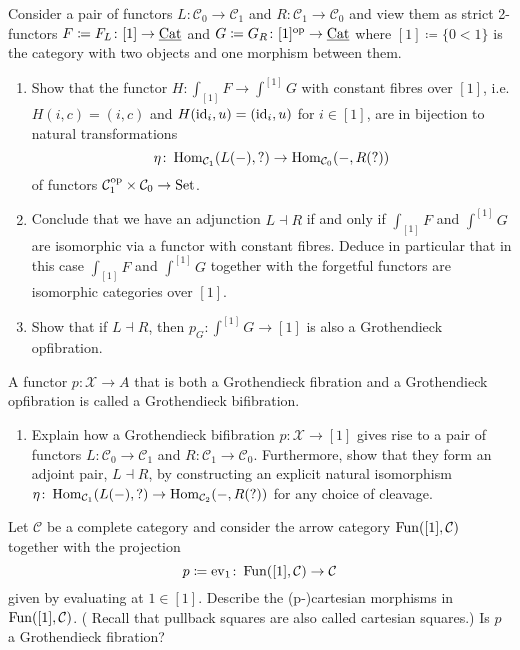 \begin{Exercise}
	Consider a pair of functors $ L \colon \mathcal{ C }_0 \to \mathcal{ C }_1 $ and $ R  \colon \mathcal{ C }_1 \to \mathcal{ C }_0 $ and view them as strict 2-functors $ F \coloneqq F_L \colon [ 1 ] \to \underline{ \operatorname{Cat} } $ and $ G \coloneqq G_R \colon [ 1 ]^{ \operatorname{op} } \to \underline{ \operatorname{Cat} } $ where $ [ 1 ] \coloneqq \{ 0 < 1 \} $ is the category with two objects and one morphism between them.
	
	\begin{enumerate}[label=(\alph*)]
		\item 
		Show that the functor $ H \colon \int_{ [ 1 ] } F \to \int^{ [ 1 ] } G $ with constant fibres over $ [ 1 ] $, i.e. $ H ( i , c ) = ( i , c ) $ and $ H ( \operatorname{id}_i , u ) = ( \operatorname{id}_i , u ) $ for $ i \in [ 1 ] $, are in bijection to natural transformations
		\[
		\eta \colon \operatorname{Hom}_{ \mathcal{ C }_1 } ( L ( - ) , ? ) \to \operatorname{Hom}_{ \mathcal{ C }_0 } ( - , R ( ? ) )
		\]
		of functors $ \mathcal{ C }_1^{ \operatorname{op} } \times \mathcal{ C }_0 \to \operatorname{Set} $.
		
		\item 
		Conclude that we have an adjunction $ L \dashv R $ if and only if $ \int_{ [1 ] } F $ and $ \int^{ [ 1 ] } G $ are isomorphic via a functor with constant fibres.
		Deduce in particular that in this case $ \int_{ [ 1 ] } F $ and $ \int^{ [ 1 ] } G $ together with the forgetful functors are isomorphic categories over $ [ 1 ] $.
		
		\item 
		Show that if $ L \dashv R $, then $ p_G \colon \int^{ [ 1 ] } G \to [ 1 ] $ is also a Grothendieck opfibration.
	\end{enumerate}
	
	A functor $ p \colon \mathcal{ X } \to  A $ that is both a Grothendieck fibration and a Grothendieck opfibration is called a Grothendieck bifibration.
	
	\begin{enumerate}[resume, label=(\alph*)]
		\item 
		Explain how a Grothendieck bifibration $ p \colon \mathcal{ X } \to [ 1 ] $ gives rise to a pair of functors $ L \colon \mathcal{ C }_0 \to \mathcal{ C }_1 $ and $ R \colon \mathcal{ C }_1 \to \mathcal{ C }_0 $.
		Furthermore, show that they form an adjoint pair, $ L \dashv R $, by constructing an explicit natural isomorphism $ \eta \colon \operatorname{Hom}_{ \mathcal{ C }_1 } ( L ( - ) , ? ) \to \operatorname{Hom}_{ \mathcal{ C }_2 } ( - , R ( ? ) ) $ for any choice of cleavage.
	\end{enumerate}
\end{Exercise}

\begin{Exercise}
	Let $ \mathcal{ C } $ be a complete category and consider the arrow category $ \operatorname{Fun} ( [ 1 ] , \mathcal{ C } ) $ together with the projection
	\[
		p 
		\coloneqq 
		\operatorname{ev}_1 \colon \operatorname{Fun} ( [ 1 ] , \mathcal{ C } ) \to \mathcal{ C } 
	\]
	given by evaluating at $ 1 \in [ 1 ] $.
	Describe the (p-)cartesian morphisms in $ \operatorname{Fun} ( [ 1 ] , \mathcal{ C } ) $.
	( Recall that pullback squares are also called cartesian squares.) Is $ p $ a Grothendieck fibration?
\end{Exercise}
